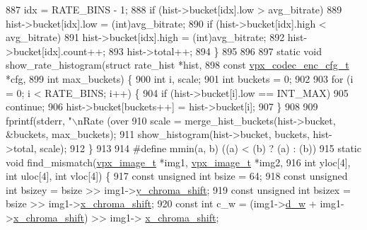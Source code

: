 \begin{DoxyCodeInclude}
{{{{{{{{{{{{{{{{{{{{{{{{{{887     idx = RATE\_BINS - 1;
888   \textcolor{keywordflow}{if} (hist->bucket[idx].low > avg\_bitrate)
889     hist->bucket[idx].low = (int)avg\_bitrate;
890   \textcolor{keywordflow}{if} (hist->bucket[idx].high < avg\_bitrate)
891     hist->bucket[idx].high = (int)avg\_bitrate;
892   hist->bucket[idx].count++;
893   hist->total++;
894 \}
895 
896 
897 \textcolor{keyword}{static} \textcolor{keywordtype}{void} show\_rate\_histogram(\textcolor{keyword}{struct} rate\_hist          *hist,
898                                 \textcolor{keyword}{const} \hyperlink{structvpx__codec__enc__cfg}{vpx\_codec\_enc\_cfg\_t} *cfg,
899                                 \textcolor{keywordtype}{int}                        max\_buckets) \{
900   \textcolor{keywordtype}{int} i, scale;
901   \textcolor{keywordtype}{int} buckets = 0;
902 
903   \textcolor{keywordflow}{for} (i = 0; i < RATE\_BINS; i++) \{
904     \textcolor{keywordflow}{if} (hist->bucket[i].low == INT\_MAX)
905       \textcolor{keywordflow}{continue};
906     hist->bucket[buckets++] = hist->bucket[i];
907   \}
908 
909   fprintf(stderr, \textcolor{stringliteral}{"\(\backslash\)nRate (over %
910   scale = merge\_hist\_buckets(hist->bucket, &buckets, max\_buckets);
911   show\_histogram(hist->bucket, buckets, hist->total, scale);
912 \}
913 
914 \textcolor{preprocessor}{#define mmin(a, b)  ((a) < (b) ? (a) : (b))}
915 \textcolor{keyword}{static} \textcolor{keywordtype}{void} find\_mismatch(\hyperlink{structvpx__image}{vpx\_image\_t} *img1, \hyperlink{structvpx__image}{vpx\_image\_t} *img2,
916                           \textcolor{keywordtype}{int} yloc[4], \textcolor{keywordtype}{int} uloc[4], \textcolor{keywordtype}{int} vloc[4]) \{
917   \textcolor{keyword}{const} \textcolor{keywordtype}{unsigned} \textcolor{keywordtype}{int} bsize = 64;
918   \textcolor{keyword}{const} \textcolor{keywordtype}{unsigned} \textcolor{keywordtype}{int} bsizey = bsize >> img1->\hyperlink{structvpx__image_a1e3d9b699d46ca32e3916d1ac635a4a2}{y\_chroma\_shift};
919   \textcolor{keyword}{const} \textcolor{keywordtype}{unsigned} \textcolor{keywordtype}{int} bsizex = bsize >> img1->\hyperlink{structvpx__image_affaf210489dcefebd90b87fd5f12dc0b}{x\_chroma\_shift};
920   \textcolor{keyword}{const} \textcolor{keywordtype}{int} c\_w = (img1->\hyperlink{structvpx__image_a806bf23143bf00a0b3fdbd6ba030c483}{d\_w} + img1->\hyperlink{structvpx__image_affaf210489dcefebd90b87fd5f12dc0b}{x\_chroma\_shift}) >> img1->
      \hyperlink{structvpx__image_affaf210489dcefebd90b87fd5f12dc0b}{x\_chroma\_shift};
}}}}}}}}}}}}}}}}}}}}}}}}}}}
\end{DoxyCodeInclude}
